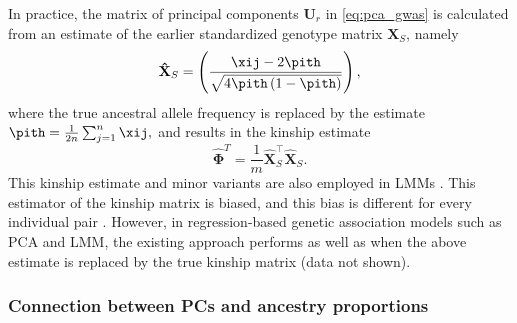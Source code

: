 \documentclass[11pt]{article}
\begin{document}
In practice, the matrix of principal components $\mathbf{U}_r$ in \cref{eq:pca_gwas} is calculated from an estimate of the earlier standardized genotype matrix $\mathbf{X}_S$, namely
\begin{equation*}
  \mathbf{\hat{X}}_S
  =
  \left(
    \frac{
      \xij - 2 \pith
    }{
      \sqrt{4 \pith \left( 1 - \pith \right)}
    }
  \right)
  ,
\end{equation*}
where the true ancestral allele frequency \pit is replaced by the estimate
$
\pith = \frac{1}{2n} \sum_{j = 1}^n \xij,
$
and results in the kinship estimate
\begin{equation}
  \label{eq:kinship_std}
  \mathbf{\hat{\Phi}}^T
  =
  \frac{1}{m}
  \mathbf{\hat{X}}_S^\intercal
  \mathbf{\hat{X}}_S
  .
\end{equation}
This kinship estimate and minor variants are also employed in LMMs \citep{yang_gcta:_2011}.
This estimator of the kinship matrix is biased, and this bias is different for every individual pair \citep{ochoa_estimating_2021, ochoa_human}.
However, in regression-based genetic association models such as PCA and LMM, the existing approach performs as well as when the above estimate is replaced by the true kinship matrix (data not shown).

\subsubsection{Connection between PCs and ancestry proportions}
\end{document}
